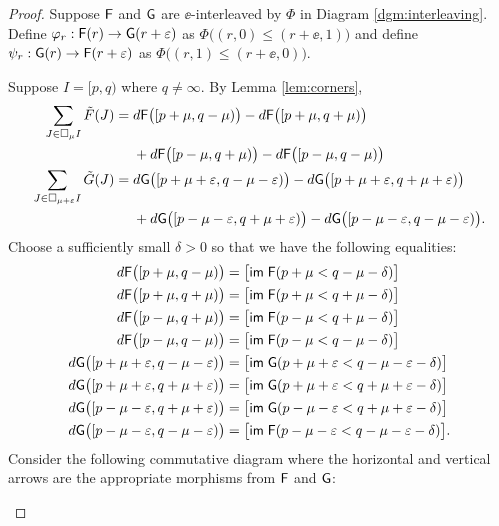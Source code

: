 \documentclass[12pt]{article}
\begin{document}
\begin{proof}
Suppose ${\mathsf{F}}$ and ${\mathsf{G}}$ are
$\ee$-interleaved by $\Phi$ in Diagram \ref{dgm:interleaving}. 
Define $\varphi_{r}: {\mathsf{F}}(r) \to {\mathsf{G}}(r+\varepsilon)$ as 
$\Phi \big( (r,0) \leq (r+\ee,1) \big)$ and define 
$\psi_{r}: {\mathsf{G}} (r) \to {\mathsf{F}} (r+\varepsilon)$ as $\Phi \big( (r,1) \leq (r+\ee,0) \big)$.

Suppose $I = [p,q)$ where $q \neq \infty$. By Lemma \ref{lem:corners}, 
\begin{align*}
\sum_{J \in \square_{\mu} I } \tilde{F}(J) =\; & 
	d {\mathsf{F}} \big( [p+\mu, q-\mu) \big) - d {\mathsf{F}} \big( [p+\mu, q+\mu) \big) \\
	&+ d {\mathsf{F}} \big( [p-\mu, q+\mu) \big) - d {\mathsf{F}} \big( [p-\mu, q-\mu) \big) \\
\sum_{J \in \square_{\mu+\varepsilon} I} \tilde{G}(J) =\; & 
	d {\mathsf{G}} \big( [p+\mu+\varepsilon, q-\mu-\varepsilon) \big) - d {\mathsf{G}} \big( [p+\mu+\varepsilon, q+\mu+\varepsilon) \big) \\
	& + d {\mathsf{G}} \big( [p-\mu-\varepsilon, q+\mu+\varepsilon) \big) - d {\mathsf{G}} \big( [p-\mu-\varepsilon, q-\mu-\varepsilon) \big).
\end{align*}
Choose a sufficiently small $\delta > 0$ so that we have the following equalities:
	\begin{align*}
d {\mathsf{F}} \big( [p+\mu, q-\mu) \big) &= \big[ \mathsf{im}\; {\mathsf{F}} ( p + \mu < q-\mu-\delta) \big] \\  
d {\mathsf{F}} \big( [p+\mu, q+\mu) \big) &= \big[ \mathsf{im}\; {\mathsf{F}} ( p+\mu < q+\mu-\delta) \big] \\
d {\mathsf{F}} \big( [p-\mu, q+\mu) \big) &= \big[ \mathsf{im}\; {\mathsf{F}} ( p-\mu < q+\mu-\delta) \big] \\
d {\mathsf{F}} \big( [p-\mu, q-\mu) \big) &= \big[ \mathsf{im}\; {\mathsf{F}} ( p-\mu < q-\mu-\delta) \big] \\
d {\mathsf{G}} \big( [p+\mu+\varepsilon, q-\mu-\varepsilon) \big) &= \big[ \mathsf{im}\; {\mathsf{G}} ( p+\mu+\varepsilon < q-\mu-\varepsilon-\delta) \big] \\
d {\mathsf{G}} \big( [p+\mu+\varepsilon, q+\mu+\varepsilon) \big) &= \big[ \mathsf{im}\; {\mathsf{G}} ( p+\mu+\varepsilon < q+\mu+\varepsilon-\delta) \big]\\
d {\mathsf{G}} \big( [p-\mu-\varepsilon, q+\mu+\varepsilon) \big) &= \big[ \mathsf{im}\; {\mathsf{G}} ( p-\mu-\varepsilon < q+\mu+\varepsilon-\delta) \big] \\
d {\mathsf{G}} \big( [p-\mu-\varepsilon, q-\mu-\varepsilon) \big) &= \big[ \mathsf{im}\; {\mathsf{F}} ( p-\mu-\varepsilon < q-\mu-\varepsilon-\delta) \big].
	\end{align*}
Consider the following commutative diagram where the horizontal and vertical arrows are the appropriate 
morphisms from ${\mathsf{F}}$ and ${\mathsf{G}}$:
\begin{center}

\end{center}
\end{proof}
\end{document}
